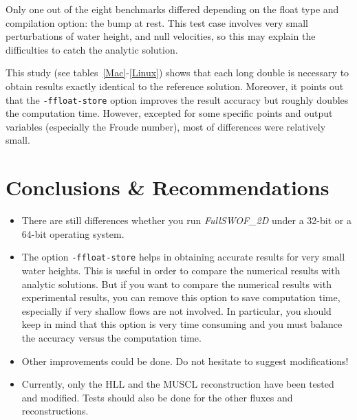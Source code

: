 \documentclass[a4paper, 11pt]{article}
\newcommand{\FullSWOF}{\emph{FullSWOF\_2D}}
\begin{document}
Only one out of the eight benchmarks differed depending on the float type and compilation option: the bump at rest. 
This test case involves very small perturbations of water height, and null velocities, so this may explain the difficulties to catch the analytic solution.

This study (see tables~\ref{Mac}-\ref{Linux}) shows that each long double is necessary to obtain results exactly identical to the reference solution. 
Moreover, it points out that the \texttt{-ffloat-store} option improves the result accuracy but roughly doubles the computation time. 
However, excepted for some specific points and output variables (especially the Froude number), most of differences were relatively small.

\section*{Conclusions \& Recommendations}

\begin{itemize}
\item There are still differences whether you run \FullSWOF{} under a 32-bit or a 64-bit operating system.

\item The option \texttt{-ffloat-store} helps in obtaining accurate results for very small water heights. This is useful in order to compare the numerical results with analytic solutions. 
But if you want to compare the numerical results with experimental results, you can remove this option to save computation time, especially if very shallow flows are not involved.
In particular, you should keep in mind that this option is very time consuming and you must balance the accuracy versus the computation time. 

\item Other improvements could be done. Do not hesitate to suggest modifications!

\item Currently, only the HLL and the MUSCL reconstruction have been tested and modified. Tests should also be done for the other fluxes and reconstructions. 
\end{itemize}
\end{document}
